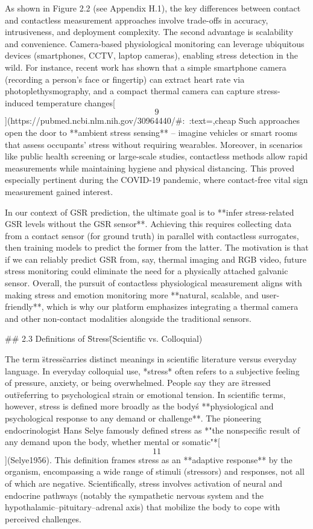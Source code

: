 \documentclass[12pt,a4paper]{article}
\begin{document}
As shown in Figure 2.2 (see Appendix H.1), the key differences between contact and contactless measurement approaches involve trade-offs in accuracy, intrusiveness, and deployment complexity. The second advantage is scalability and convenience. Camera-based
physiological monitoring can leverage ubiquitous devices (smartphones,
CCTV, laptop cameras), enabling stress detection in the wild. For
instance, recent work has shown that a simple smartphone camera
(recording a person's face or fingertip) can extract heart rate via
photoplethysmography, and a compact thermal camera can capture
stress-induced temperature
changes[\[9\]](https://pubmed.ncbi.nlm.nih.gov/30964440/#:~:text=,cheap%
Such approaches open the door to **ambient stress sensing** -- imagine
vehicles or smart rooms that assess occupants' stress without requiring
wearables. Moreover, in scenarios like public health screening or
large-scale studies, contactless methods allow rapid measurements while
maintaining hygiene and physical distancing. This proved especially
pertinent during the COVID-19 pandemic, where contact-free vital sign
measurement gained interest.

In our context of GSR prediction, the ultimate goal is to **infer
stress-related GSR levels without the GSR sensor**. Achieving this
requires collecting data from a contact sensor (for ground truth) in
parallel with contactless surrogates, then training models to predict
the former from the latter. The motivation is that if we can reliably
predict GSR from, say, thermal imaging and RGB video, future stress
monitoring could eliminate the need for a physically attached galvanic
sensor. Overall, the pursuit of contactless physiological measurement
aligns with making stress and emotion monitoring more **natural,
scalable, and user-friendly**, which is why our platform emphasizes
integrating a thermal camera and other non-contact modalities alongside
the traditional sensors.

## 2.3 Definitions of \"Stress\" (Scientific vs. Colloquial)

The term \"stress\" carries distinct meanings in scientific literature
versus everyday language. In everyday colloquial use, *stress* often
refers to a subjective feeling of pressure, anxiety, or being
overwhelmed. People say they are \"stressed out\" referring to
psychological strain or emotional tension. In scientific terms, however,
stress is defined more broadly as the body\'s **physiological and
psychological response to any demand or challenge**. The pioneering
endocrinologist Hans Selye famously defined stress as *"the nonspecific
result of any demand upon the body, whether mental or
somatic"*[\[11\]](Selye1956).
This definition frames stress as an **adaptive response** by the
organism, encompassing a wide range of stimuli (stressors) and
responses, not all of which are negative. Scientifically, stress
involves activation of neural and endocrine pathways (notably the
sympathetic nervous system and the hypothalamic--pituitary--adrenal
axis) that mobilize the body to cope with perceived challenges.
\end{document}
